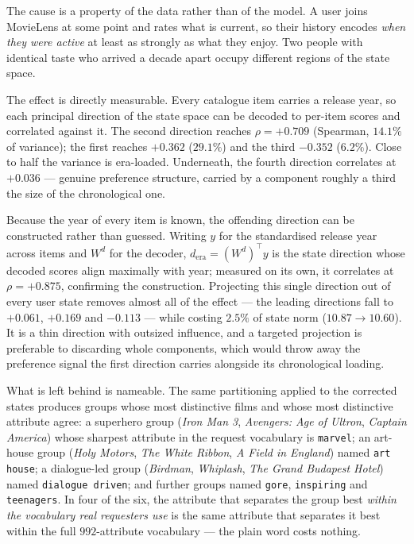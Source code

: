 \documentclass[11pt]{article}
\begin{document}
The cause is a property of the data rather than of the model. A user joins MovieLens at some point
and rates what is current, so their history encodes \emph{when they were active} at least as
strongly as what they enjoy. Two people with identical taste who arrived a decade apart occupy
different regions of the state space.

The effect is directly measurable. Every catalogue item carries a release year, so each principal
direction of the state space can be decoded to per-item scores and correlated against it. The
second direction reaches $\rho = +0.709$ (Spearman, $14.1\%$ of variance); the first reaches
$+0.362$ ($29.1\%$) and the third $-0.352$ ($6.2\%$). Close to half the variance is era-loaded.
Underneath, the fourth direction correlates at $+0.036$ --- genuine preference structure, carried by
a component roughly a third the size of the chronological one.

Because the year of every item is known, the offending direction can be constructed rather than
guessed. Writing $y$ for the standardised release year across items and $W^{d}$ for the decoder,
$d_{\text{era}} = (W^{d})^{\top} y$ is the state direction whose decoded scores align maximally with
year; measured on its own, it correlates at $\rho = +0.875$, confirming the construction. Projecting
this single direction out of every user state removes almost all of the effect --- the leading
directions fall to $+0.061$, $+0.169$ and $-0.113$ --- while costing $2.5\%$ of state norm
($10.87 \rightarrow 10.60$). It is a thin direction with outsized influence, and a targeted
projection is preferable to discarding whole components, which would throw away the preference
signal the first direction carries alongside its chronological loading.

What is left behind is nameable. The same partitioning applied to the corrected states produces
groups whose most distinctive films and whose most distinctive attribute agree: a superhero group
(\emph{Iron Man 3}, \emph{Avengers: Age of Ultron}, \emph{Captain America}) whose sharpest attribute
in the request vocabulary is \texttt{marvel}; an art-house group (\emph{Holy Motors}, \emph{The White
Ribbon}, \emph{A Field in England}) named \texttt{art house}; a dialogue-led group (\emph{Birdman},
\emph{Whiplash}, \emph{The Grand Budapest Hotel}) named \texttt{dialogue driven}; and further groups
named \texttt{gore}, \texttt{inspiring} and \texttt{teenagers}. In four of the six, the attribute that
separates the group best \emph{within the vocabulary real requesters use} is the same attribute that
separates it best within the full $992$-attribute vocabulary --- the plain word costs nothing.
\end{document}
